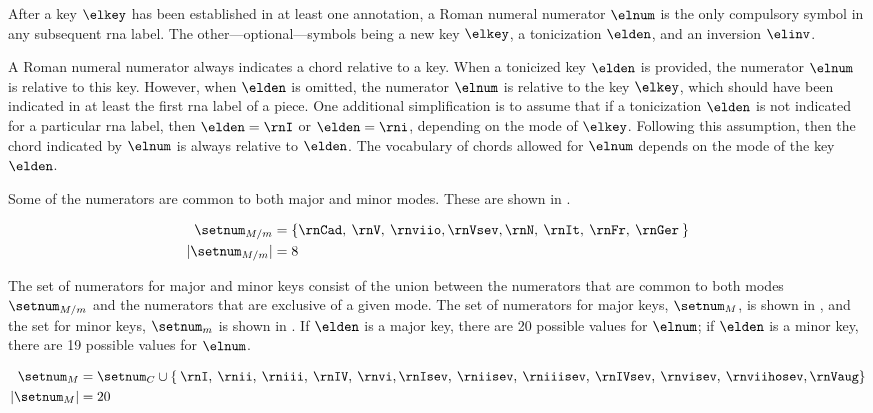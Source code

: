 
After a key $\elkey$ has been established in at least one
annotation, a Roman numeral numerator $\elnum$ is the only
compulsory symbol in any subsequent \gls{rna} label. The
other---optional---symbols being a new key $\elkey$, a
tonicization $\elden$, and an inversion $\elinv$.

A Roman numeral numerator always indicates a chord relative
to a key. When a tonicized key $\elden$ is provided, the
numerator $\elnum$ is relative to this key. However, when
$\elden$ is omitted, the numerator $\elnum$ is relative to
the key $\elkey$, which should have been indicated in at
least the first \gls{rna} label of a piece. One additional
simplification is to assume that if a tonicization $\elden$
is not indicated for a particular \gls{rna} label, then
$\elden = \rnI$ or $\elden = \rni$, depending on the mode of
$\elkey$. Following this assumption, then the chord
indicated by $\elnum$ is always relative to $\elden$. The
vocabulary of chords allowed for $\elnum$ depends on the
mode of the key $\elden$.

Some of the numerators are common to both major and minor
modes. These are shown in . 

\begin{equation}
    \label{eq:common_numerators}
    \begin{split}
    \setnum_{M/m} &= \{ \rnCad, \: \rnV, \: \rnviio,
    \rnVsev, \rnN, \: \rnIt, \: \rnFr, \: \rnGer \: \} \\
    | \setnum_{M/m} | &= 8
    \end{split}
\end{equation}

The set of numerators for major and minor keys consist of
the union between the numerators that are common to both
modes $\setnum_{M/m}$ and the numerators that are exclusive
of a given mode. The set of numerators for major keys,
$\setnum_{M}$, is shown in , and the
set for minor keys, $\setnum_{m}$ is shown in
. If $\elden$ is a major key, there
are 20 possible values for $\elnum$; if $\elden$ is a minor
key, there are 19 possible values for $\elnum$.

\begin{equation}
    \label{eq:major_numerators}
    \begin{split}
    \setnum_{M} &= \setnum_{C} \cup \{ \: \rnI, \: \rnii, \: 
    \rniii, \: \rnIV, \: \rnvi, \rnIsev, \: \rniisev, \: 
    \rniiisev, \: \rnIVsev, \: \rnvisev, \: \rnviihosev, \rnVaug \} \\
    | \setnum_{M} | &= 20
    \end{split}
\end{equation}

